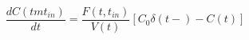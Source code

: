 \begin{equation}
\frac{dC(tmt_{in})}{dt} = \frac{F(t,t_{in})}{V(t)}[C_0\delta(t-)-C(t)]
\end{equation}